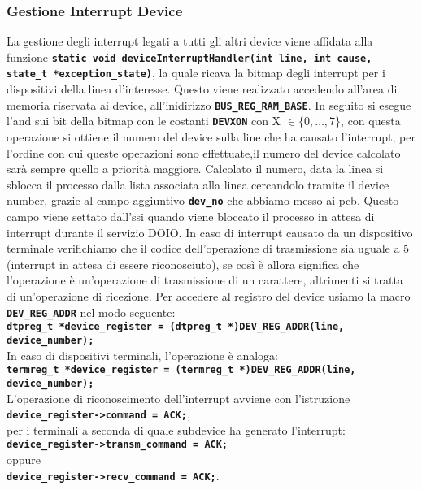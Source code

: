 \documentclass{article}
\begin{document}
\subsubsection{Gestione Interrupt Device}
La gestione degli interrupt legati a tutti gli altri device viene affidata alla funzione \texttt{\textbf{static void deviceInterruptHandler(int line, int cause, state\_t *exception\_state)}}, 
la quale ricava la bitmap degli interrupt per i dispositivi della linea d'interesse. Questo viene realizzato accedendo 
all'area di memoria riservata ai device, all'inidirizzo \texttt{\textbf{BUS\_REG\_RAM\_BASE}}.
In seguito si esegue l'and sui bit della bitmap con le costanti \texttt{\textbf{DEVXON}} con X $\in \{0, \ldots, 7\}$, 
con questa operazione si ottiene il numero del device sulla line che ha causato l'interrupt, per l'ordine con cui queste 
operazioni sono effettuate,il numero del device calcolato sarà sempre quello a priorità maggiore. 
Calcolato il numero, data la linea si sblocca il processo dalla lista associata alla linea cercandolo tramite il device 
number, grazie al campo aggiuntivo \texttt{\textbf{dev\_no}} che abbiamo messo ai pcb. Questo campo viene settato dall'ssi 
quando viene bloccato il processo in attesa di interrupt durante il servizio DOIO. In caso di interrupt causato da un 
dispositivo terminale verifichiamo che il codice dell'operazione di trasmissione sia uguale a 5 (interrupt in attesa di 
essere riconosciuto), se così è allora significa che l'operazione è un'operazione di trasmissione di un carattere, altrimenti 
si tratta di un'operazione di ricezione.
\newpage
Per accedere al registro del device usiamo la macro \texttt{\textbf{DEV\_REG\_ADDR}} nel modo seguente: \\
\texttt{\textbf{dtpreg\_t *device\_register = (dtpreg\_t *)DEV\_REG\_ADDR(line, device\_number);}} \\
In caso di dispositivi terminali, l'operazione è analoga: \\
\texttt{\textbf{termreg\_t *device\_register = (termreg\_t *)DEV\_REG\_ADDR(line, device\_number);}} \\
L'operazione di riconoscimento dell'interrupt avviene con l'istruzione\\ \texttt{\textbf{device\_register->command = ACK;}}, 
\\per i terminali a seconda di quale subdevice ha generato l'interrupt: \\ \texttt{\textbf{device\_register->transm\_command = ACK;}} \\ oppure \\ \texttt{\textbf{device\_register->recv\_command = ACK;}}.
\end{document}
